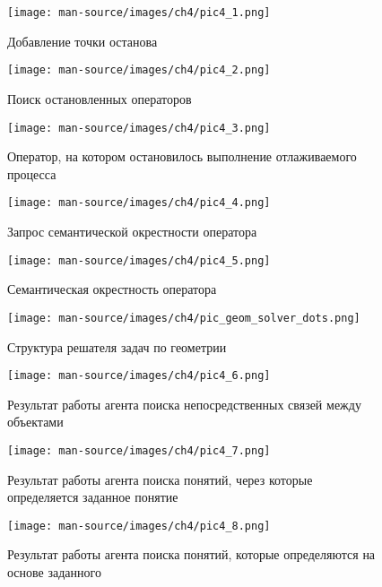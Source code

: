 \documentclass{thesisby}
\begin{document}
\begin{figure}[H]
    \centering
    \texttt{[image: man-source/images/ch4/pic4\_1.png]}
    \caption{Добавление точки останова}
    \label{fig:pic4_1}
\end{figure}


\begin{figure}[H]
    \centering
    \texttt{[image: man-source/images/ch4/pic4\_2.png]}
    \caption{Поиск остановленных операторов}
    \label{fig:pic4_2}
\end{figure}


\begin{figure}[H]
    \centering
    \texttt{[image: man-source/images/ch4/pic4\_3.png]}
    \caption{Оператор, на котором остановилось выполнение отлаживаемого процесса}
    \label{fig:pic4_3}
\end{figure}


\begin{figure}[H]
    \centering
    \texttt{[image: man-source/images/ch4/pic4\_4.png]}
    \caption{Запрос семантической окрестности оператора}
    \label{fig:pic4_4}
\end{figure}


\begin{figure}[H]
    \centering
    \texttt{[image: man-source/images/ch4/pic4\_5.png]}
    \caption{Семантическая окрестность оператора}
    \label{fig:pic4_5}
\end{figure}


\begin{figure}[H]
    \centering
    \texttt{[image: man-source/images/ch4/pic\_geom\_solver\_dots.png]}
    \caption{Структура решателя задач по геометрии}
    \label{fig:pic_geom_solver}
\end{figure}


\begin{figure}[H]
    \centering
    \texttt{[image: man-source/images/ch4/pic4\_6.png]}
    \caption{Результат работы агента поиска непосредственных связей между объектами}
    \label{fig:pic4_6}
\end{figure}


\begin{figure}[H]
    \centering
    \texttt{[image: man-source/images/ch4/pic4\_7.png]}
    \caption{Результат работы агента поиска понятий, через которые определяется заданное понятие}
    \label{fig:pic4_7}
\end{figure}


\begin{figure}[H]
    \centering
    \texttt{[image: man-source/images/ch4/pic4\_8.png]}
    \caption{Результат работы агента поиска понятий, которые определяются на основе заданного}
    \label{fig:pic4_8}
\end{figure}
\end{document}
